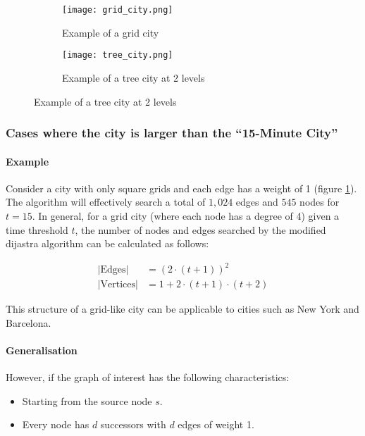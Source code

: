\begin{figure}[H]
    \centering
    \begin{subfigure}{0.5\textwidth}
        \centering
        \texttt{[image: grid\_city.png]}
        \caption{Example of a grid city}
        \label{fig:grid_city}
    \end{subfigure}\hfill
    \begin{subfigure}{0.5\textwidth}
        \centering
        \texttt{[image: tree\_city.png]}
        \caption{Example of a tree city at 2 levels}
        \label{fig:tree_city}
    \end{subfigure}
\end{figure}

\subsubsection{Cases where the city is larger than the ``15-Minute City''}

\paragraph{Example}

Consider a city with only square grids and each edge has a weight of 1 (figure \ref{fig:grid_city}). The algorithm will effectively search a total of $1,024$ edges and $545$ nodes for $t=15$. In general, for a grid city (where each node has a degree of 4) given a time threshold $t$, the number of nodes and edges searched by the modified dijastra algorithm can be calculated as follows:

$$
\begin{aligned}
    |\text{Edges}|&=(2\cdot(t+1))^2\\
    |\text{Vertices}|&=1+2\cdot(t+1)\cdot(t+2)
\end{aligned}
$$

This structure of a grid-like city can be applicable to cities such as New York and Barcelona.

\paragraph{Generalisation}

However, if the graph of interest has the following characteristics:

\begin{itemize}
    \item Starting from the source node $s$.
    \item Every node has $d$ successors with $d$ edges of weight 1.
\end{itemize}

